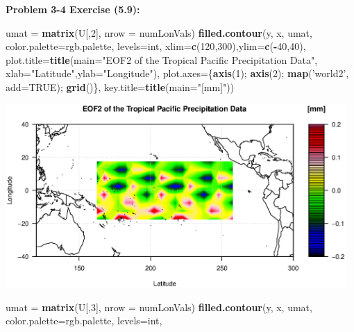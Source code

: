 \documentclass[11pt]{article}
\newenvironment{problem}[1]{\textbf{Problem #1:}}{\newpage}
\newenvironment{Shaded}{\begin{snugshade}}{\end{snugshade}}
\newcommand{\DataTypeTok}[1]{\textcolor[rgb]{0.13,0.29,0.53}{#1}}
\newcommand{\DecValTok}[1]{\textcolor[rgb]{0.00,0.00,0.81}{#1}}
\newcommand{\KeywordTok}[1]{\textcolor[rgb]{0.13,0.29,0.53}{\textbf{#1}}}
\newcommand{\NormalTok}[1]{#1}
\newcommand{\OperatorTok}[1]{\textcolor[rgb]{0.81,0.36,0.00}{\textbf{#1}}}
\newcommand{\OtherTok}[1]{\textcolor[rgb]{0.56,0.35,0.01}{#1}}
\newcommand{\StringTok}[1]{\textcolor[rgb]{0.31,0.60,0.02}{#1}}
\begin{document}
\begin{problem}{3-4 Exercise (5.9)}
\begin{enumerate}[label = (\alph*)]
\begin{Shaded}
\begin{Highlighting}[]
\NormalTok{umat =}\StringTok{ }\KeywordTok{matrix}\NormalTok{(U[,}\DecValTok{2}\NormalTok{], }\DataTypeTok{nrow =}\NormalTok{ numLonVals)}
\KeywordTok{filled.contour}\NormalTok{(y, x, umat, }\DataTypeTok{color.palette=}\NormalTok{rgb.palette, }\DataTypeTok{levels=}\NormalTok{int,}
               \DataTypeTok{xlim=}\KeywordTok{c}\NormalTok{(}\DecValTok{120}\NormalTok{,}\DecValTok{300}\NormalTok{),}\DataTypeTok{ylim=}\KeywordTok{c}\NormalTok{(}\OperatorTok{-}\DecValTok{40}\NormalTok{,}\DecValTok{40}\NormalTok{),}
               \DataTypeTok{plot.title=}\KeywordTok{title}\NormalTok{(}\DataTypeTok{main=}\StringTok{"EOF2 of the Tropical Pacific}
                                     \StringTok{ Precipitation Data"}\NormalTok{,}
                                \DataTypeTok{xlab=}\StringTok{"Latitude"}\NormalTok{,}\DataTypeTok{ylab=}\StringTok{"Longitude"}\NormalTok{),}
               \DataTypeTok{plot.axes=}\NormalTok{\{}\KeywordTok{axis}\NormalTok{(}\DecValTok{1}\NormalTok{); }\KeywordTok{axis}\NormalTok{(}\DecValTok{2}\NormalTok{); }\KeywordTok{map}\NormalTok{(}\StringTok{'world2'}\NormalTok{, }\DataTypeTok{add=}\OtherTok{TRUE}\NormalTok{); }\KeywordTok{grid}\NormalTok{()\},}
               \DataTypeTok{key.title=}\KeywordTok{title}\NormalTok{(}\DataTypeTok{main=}\StringTok{"[mm]"}\NormalTok{))}
\end{Highlighting}
\end{Shaded}
\includegraphics[height = 7cm]{Figures/Prob3/EOF2}
\begin{Shaded}
\begin{Highlighting}[]
\NormalTok{umat =}\StringTok{ }\KeywordTok{matrix}\NormalTok{(U[,}\DecValTok{3}\NormalTok{], }\DataTypeTok{nrow =}\NormalTok{ numLonVals)}
\KeywordTok{filled.contour}\NormalTok{(y, x, umat, }\DataTypeTok{color.palette=}\NormalTok{rgb.palette, }\DataTypeTok{levels=}\NormalTok{int,}

\end{Highlighting}
\end{Shaded}
\end{enumerate}
\end{problem}
\end{document}
